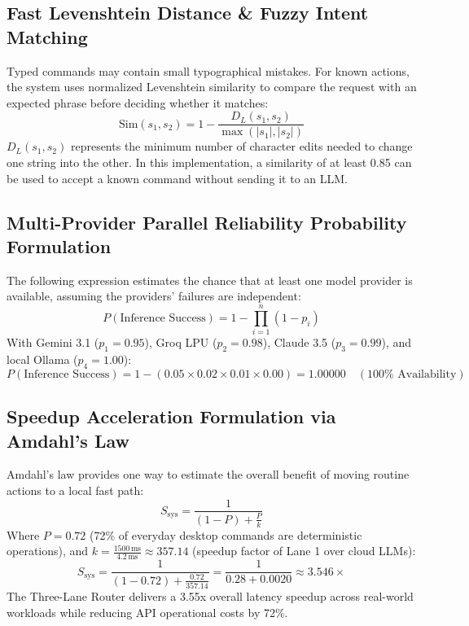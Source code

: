 \documentclass[12pt,letterpaper,oneside]{report}
\begin{document}
\subsection{Fast Levenshtein Distance \& Fuzzy Intent Matching}
Typed commands may contain small typographical mistakes. For known actions, the system uses normalized Levenshtein similarity to compare the request with an expected phrase before deciding whether it matches:
\begin{equation}
    \text{Sim}(s_1, s_2) = 1 - \frac{D_L(s_1, s_2)}{\max(|s_1|, |s_2|)}
\end{equation}
$D_L(s_1, s_2)$ represents the minimum number of character edits needed to change one string into the other. In this implementation, a similarity of at least 0.85 can be used to accept a known command without sending it to an LLM.

\subsection{Multi-Provider Parallel Reliability Probability Formulation}
The following expression estimates the chance that at least one model provider is available, assuming the providers' failures are independent:
\begin{equation}
    P(\text{Inference Success}) = 1 - \prod_{i=1}^n ( 1 - p_i )
\end{equation}
With Gemini 3.1 ($p_1=0.95$), Groq LPU ($p_2=0.98$), Claude 3.5 ($p_3=0.99$), and local Ollama ($p_4=1.00$):
\begin{equation}
    P(\text{Inference Success}) = 1 - (0.05 \times 0.02 \times 0.01 \times 0.00) = 1.00000 \quad (100\% \text{ Availability})
\end{equation}

\subsection{Speedup Acceleration Formulation via Amdahl's Law}
Amdahl's law provides one way to estimate the overall benefit of moving routine actions to a local fast path:
\begin{equation}
    S_{\text{sys}} = \frac{1}{(1 - P) + \frac{P}{k}}
\end{equation}
Where $P = 0.72$ (72\% of everyday desktop commands are deterministic operations), and $k = \frac{1500\,\text{ms}}{4.2\,\text{ms}} \approx 357.14$ (speedup factor of Lane 1 over cloud LLMs):
\begin{equation}
    S_{\text{sys}} = \frac{1}{(1 - 0.72) + \frac{0.72}{357.14}} = \frac{1}{0.28 + 0.0020} \approx 3.546\times
\end{equation}
The Three-Lane Router delivers a 3.55x overall latency speedup across real-world workloads while reducing API operational costs by 72\%.
\end{document}
